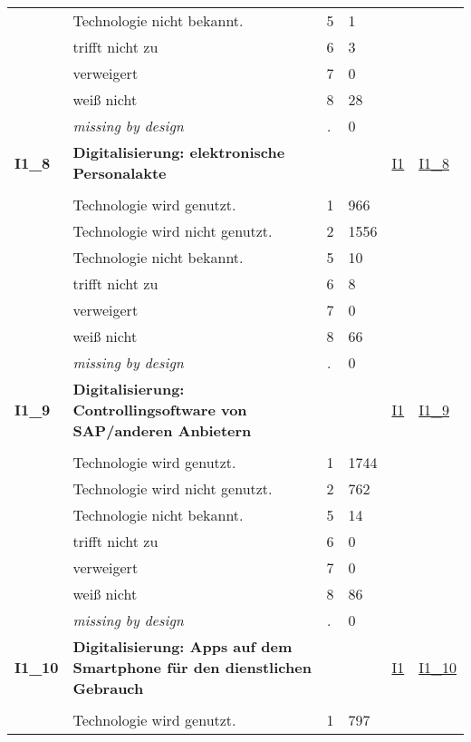 \begin{longtable}{| L{2.45cm} | L{6cm} | C{1.5cm} | R{1cm} | C{2.25cm} | C{2.25cm} |}
   & Technologie nicht bekannt. & 5 & 1 &  &  \\ 
   & trifft nicht zu & 6 & 3 &  &  \\ 
   & verweigert & 7 & 0 &  &  \\ 
   & weiß nicht & 8 & 28 &  &  \\ 
   & \textit{missing by design} & \textit{.} & 0 &  &  \\ 
   \midrule
\textbf{I1\_8}\label{var:I1:8} & \textbf{Digitalisierung: elektronische Personalakte} &  &  & \hyperref[I1]{I1} & \hyperref[var:suf:I1:8]{I1\_8} \\ 
   &  &  &  &  &  \\ 
   & Technologie wird genutzt. & 1 & 966 &  &  \\ 
   & Technologie wird nicht genutzt. & 2 & 1556 &  &  \\ 
   & Technologie nicht bekannt. & 5 & 10 &  &  \\ 
   & trifft nicht zu & 6 & 8 &  &  \\ 
   & verweigert & 7 & 0 &  &  \\ 
   & weiß nicht & 8 & 66 &  &  \\ 
   & \textit{missing by design} & \textit{.} & 0 &  &  \\ 
   \midrule
\textbf{I1\_9}\label{var:I1:9} & \textbf{Digitalisierung: Controllingsoftware von SAP/anderen Anbietern} &  &  & \hyperref[I1]{I1} & \hyperref[var:suf:I1:9]{I1\_9} \\ 
   &  &  &  &  &  \\ 
   & Technologie wird genutzt. & 1 & 1744 &  &  \\ 
   & Technologie wird nicht genutzt. & 2 & 762 &  &  \\ 
   & Technologie nicht bekannt. & 5 & 14 &  &  \\ 
   & trifft nicht zu & 6 & 0 &  &  \\ 
   & verweigert & 7 & 0 &  &  \\ 
   & weiß nicht & 8 & 86 &  &  \\ 
   & \textit{missing by design} & \textit{.} & 0 &  &  \\ 
   \midrule
\textbf{I1\_10}\label{var:I1:10} & \textbf{Digitalisierung: Apps auf dem Smartphone für den dienstlichen Gebrauch} &  &  & \hyperref[I1]{I1} & \hyperref[var:suf:I1:10]{I1\_10} \\ 
   &  &  &  &  &  \\ 
   & Technologie wird genutzt. & 1 & 797 &  &  \\ 

\end{longtable}
